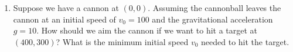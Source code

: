 \documentclass{article}
\begin{document}
\begin{enumerate}
\begin{figure}[h]
\end{figure}

\item  Suppose we have a cannon at $(0,0)$. Assuming the cannonball leaves the cannon at an initial speed of $v_0=100$ and the gravitational acceleration $g = 10$. How should we aim the cannon if we want to hit a target at $(400,300)$? What is the minimum initial speed $v_0$ needed to hit the target. 



\end{enumerate}
\end{document}
